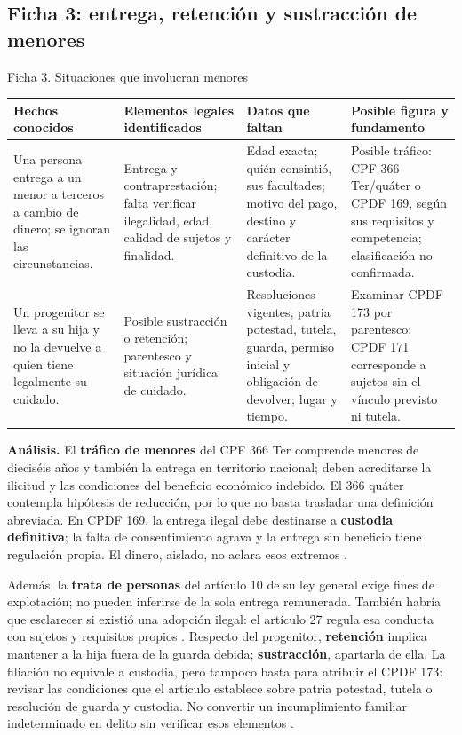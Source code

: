 \documentclass[spanish,letterpaper,oneside]{article}
\makeatletter
\renewcommand{\arraystretch}{1.08}
\newcommand{\tablaficha}[1]{%
  \begingroup\fontsize{10.4}{11.7}\selectfont
  \setlength{\tabcolsep}{3pt}\renewcommand{\arraystretch}{1.12}
  \begin{tabularx}{\linewidth}{@{}*{4}{>{\raggedright\arraybackslash}X}@{}}
  \toprule
  \textbf{Hechos conocidos} & \textbf{Elementos legales identificados} & \textbf{Datos que faltan} & \textbf{Posible figura y fundamento} \\
  \midrule
  #1
  \bottomrule
  \end{tabularx}
  \endgroup\par\vspace{4pt}
}
\makeatother
\begin{document}
\subsection*{Ficha 3: entrega, retención y sustracción de menores}
\begin{casoestudio}{Ficha 3. Situaciones que involucran menores}
\tablaficha{
Una persona entrega a un menor a terceros a cambio de dinero; se ignoran las circunstancias. & Entrega y contraprestación; falta verificar ilegalidad, edad, calidad de sujetos y finalidad. & Edad exacta; quién consintió, sus facultades; motivo del pago, destino y carácter definitivo de la custodia. & Posible tráfico: CPF 366 Ter/quáter o CPDF 169, según sus requisitos y competencia; clasificación no confirmada. \\
\midrule
Un progenitor se lleva a su hija y no la devuelve a quien tiene legalmente su cuidado. & Posible sustracción o retención; parentesco y situación jurídica de cuidado. & Resoluciones vigentes, patria potestad, tutela, guarda, permiso inicial y obligación de devolver; lugar y tiempo. & Examinar CPDF 173 por parentesco; CPDF 171 corresponde a sujetos sin el vínculo previsto ni tutela. \\
}
\textbf{Análisis.} El \textbf{tráfico de menores} del CPF 366 Ter comprende menores de dieciséis años y también la entrega en territorio nacional; deben acreditarse la ilicitud y las condiciones del beneficio económico indebido. El 366 quáter contempla hipótesis de reducción, por lo que no basta trasladar una definición abreviada. En CPDF 169, la entrega ilegal debe destinarse a \textbf{custodia definitiva}; la falta de consentimiento agrava y la entrega sin beneficio tiene regulación propia. El dinero, aislado, no aclara esos extremos \citep{cpfS4Vigente,cpdfS4Vigente}.

Además, la \textbf{trata de personas} del artículo 10 de su ley general exige fines de explotación; no pueden inferirse de la sola entrega remunerada. También habría que esclarecer si existió una adopción ilegal: el artículo 27 regula esa conducta con sujetos y requisitos propios \citep{trataS5}. Respecto del progenitor, \textbf{retención} implica mantener a la hija fuera de la guarda debida; \textbf{sustracción}, apartarla de ella. La filiación no equivale a custodia, pero tampoco basta para atribuir el CPDF 173: revisar las condiciones que el artículo establece sobre patria potestad, tutela o resolución de guarda y custodia. No convertir un incumplimiento familiar indeterminado en delito sin verificar esos elementos \citep{cpdfS4Vigente}.
\end{casoestudio}
\end{document}
